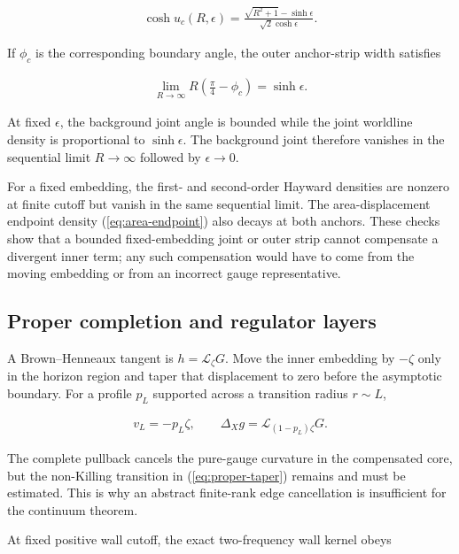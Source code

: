 \begin{align}
\cosh u_c(R,\epsilon)
=\frac{\sqrt{R^2+1}-\sinh\epsilon}
{\sqrt2\cosh\epsilon}. \label{eq:cutoff-intersection}
\end{align}

If $\phi_c$ is the corresponding boundary angle, the outer anchor-strip width satisfies

\begin{align}
\lim_{R\to\infty}R\left(\frac\pi4-\phi_c\right)
=\sinh\epsilon. \label{eq:anchor-width}
\end{align}

At fixed $\epsilon$, the background joint angle is bounded while the joint worldline density is proportional to $\sinh\epsilon$. The background joint therefore vanishes in the sequential limit $R\to\infty$ followed by $\epsilon\to0$.

For a fixed embedding, the first- and second-order Hayward densities are nonzero at finite cutoff but vanish in the same sequential limit. The area-displacement endpoint density (\ref{eq:area-endpoint}) also decays at both anchors. These checks show that a bounded fixed-embedding joint or outer strip cannot compensate a divergent inner term; any such compensation would have to come from the moving embedding or from an incorrect gauge representative.

\subsection{Proper completion and regulator layers}\label{subsec:proper-completion}

A Brown--Henneaux tangent is $h=\mathcal L_\zeta G$. Move the inner embedding by $-\zeta$ only in the horizon region and taper that displacement to zero before the asymptotic boundary. For a profile $p_L$ supported across a transition radius $r\sim L$,

\begin{align}
v_L=-p_L\zeta,
\qquad
\Delta_Xg=\mathcal L_{(1-p_L)\zeta}G. \label{eq:proper-taper}
\end{align}

The complete pullback cancels the pure-gauge curvature in the compensated core, but the non-Killing transition in (\ref{eq:proper-taper}) remains and must be estimated. This is why an abstract finite-rank edge cancellation is insufficient for the continuum theorem.

At fixed positive wall cutoff, the exact two-frequency wall kernel obeys

